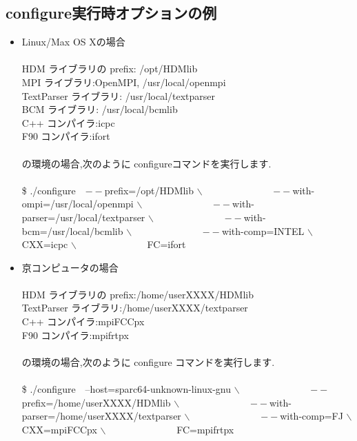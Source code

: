 \documentclass[twoside]{jbook}
\begin{document}
\subsection{configure実行時オプションの例}
\begin{itemize}
\item Linux/Max OS Xの場合\\\\
HDM ライブラリの prefix: /opt/HDMlib \\
MPI ライブラリ:OpenMPI, /usr/local/openmpi \\
TextParser ライブラリ: /usr/local/textparser \\
BCM ライブラリ: /usr/local/bcmlib \\
C++ コンパイラ:icpc \\
F90 コンパイラ:ifort \\\\

の環境の場合,次のように configureコマンドを実行します.\\\\
{\sf
\$ ./configure　$--$prefix=/opt/HDMlib $\backslash$ \newline
　　　　　　　$--$with-ompi=/usr/local/openmpi $\backslash$ \newline
　　　　　　　$--$with-parser=/usr/local/textparser $\backslash$ \newline
　　　　　　　$--$with-bcm=/usr/local/bcmlib $\backslash$ \newline
　　　　　　　$--$with-comp=INTEL $\backslash$ \newline
　　　　　　　CXX=icpc $\backslash$ \newline
　　　　　　　FC=ifort \newline
}

\item 京コンピュータの場合\\\\
HDM ライブラリの prefix:/home/userXXXX/HDMlib \\
TextParser ライブラリ:/home/userXXXX/textparser \\
C++ コンパイラ:mpiFCCpx \\
F90 コンパイラ:mpifrtpx \\\\
の環境の場合,次のように configure コマンドを実行します.\\\\
{\sf
\$ ./configure　--host=sparc64-unknown-linux-gnu $\backslash$ \newline
　　　　　　　$--$prefix=/home/userXXXX/HDMlib $\backslash$ \newline
　　　　　　　$--$with-parser=/home/userXXXX/textparser $\backslash$ \newline
　　　　　　　$--$with-comp=FJ $\backslash$ \newline
　　　　　　　CXX=mpiFCCpx $\backslash$ \newline
　　　　　　　FC=mpifrtpx \newline
}


\end{itemize}
\end{document}
